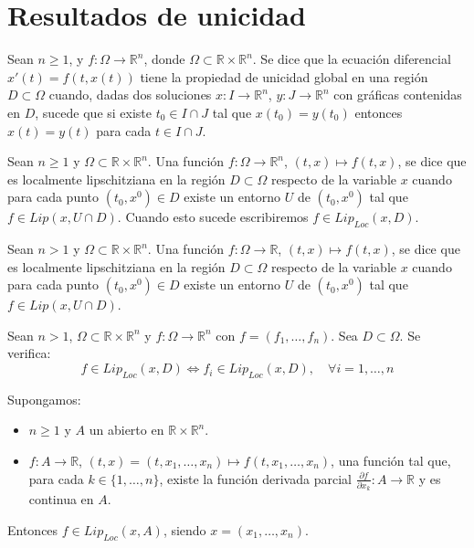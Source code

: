 \chapter{Resultados de unicidad}
\begin{definition}
    Sean $n \geq 1$, y $f: \Omega \to \mathbb{R}^n$, donde $\Omega \subset \mathbb{R} \times \mathbb{R}^n$.
    Se dice que la ecuación diferencial $x'(t) = f(t, x(t))$ tiene la propiedad de unicidad global en una región $D \subset \Omega$ cuando, dadas dos soluciones $x: I \to \mathbb{R}^n$, $y: J \to \mathbb{R}^n$ con gráficas contenidas en $D$, sucede que si existe $t_0 \in I \cap J$ tal que $x(t_0) = y(t_0)$ entonces $x(t) = y(t)$ para cada $t \in I \cap J$.
\end{definition}

\begin{definition}
    Sean $n \geq 1$ y $\Omega \subset \mathbb{R} \times \mathbb{R}^n$.
    Una función $f: \Omega \to \mathbb{R}^n$, $(t, x) \mapsto f(t, x)$, se dice que es localmente lipschitziana en la región $D \subset \Omega$ respecto de la variable $x$ cuando para cada punto $(t_0, x^0) \in D$ existe un entorno $U$ de $(t_0, x^0)$ tal que $f \in Lip(x, U \cap D)$.
    Cuando esto sucede escribiremos $f \in Lip_{Loc}(x, D)$.
\end{definition}

\begin{definition}
    Sean $n > 1$ y $\Omega \subset \mathbb{R} \times \mathbb{R}^n$.
    Una función $f: \Omega \to \mathbb{R}$, $(t, x) \mapsto f(t, x)$, se dice que es localmente lipschitziana en la región $D \subset \Omega$ respecto de la variable $x$ cuando para cada punto $(t_0, x^0) \in D$ existe un entorno $U$ de $(t_0, x^0)$ tal que $f \in Lip(x, U \cap D)$.
\end{definition}

\begin{proposition}
    Sean $n > 1$, $\Omega \subset \mathbb{R} \times \mathbb{R}^n$ y $f: \Omega \to \mathbb{R}^n$ con $f = (f_1, \dots, f_n)$.
    Sea $D \subset \Omega$.
    Se verifica:
    $$f \in Lip_{Loc}(x, D) \Leftrightarrow f_i \in Lip_{Loc}(x, D), \quad \forall i = 1, \dots, n$$
\end{proposition}

\begin{proposition}
    Supongamos:
    \begin{itemize}
        \item $n \geq 1$ y $A$ un abierto en $\mathbb{R} \times \mathbb{R}^n$.
        \item $f: A \to \mathbb{R}$, $(t, x) = (t, x_1, \dots, x_n) \mapsto f(t, x_1, \dots, x_n)$, una función tal que, para cada $k \in \{1, \dots, n\}$, existe la función derivada parcial $\frac{\partial f}{\partial x_k}: A \to \mathbb{R}$ y es continua en $A$.
    \end{itemize}
    Entonces $f \in Lip_{Loc}(x, A)$, siendo $x = (x_1, \dots, x_n)$.
\end{proposition}

